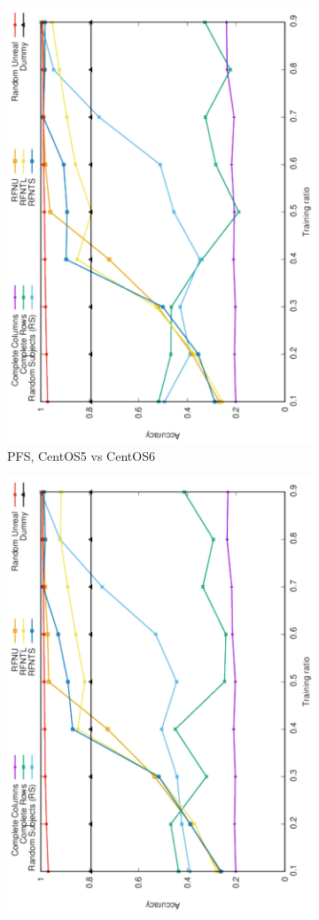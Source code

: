 \documentclass[10pt, conference, compsocconf]{IEEEtran}
\begin{document}
\begin{figure}
\begin{subfigure}[b]{0.4\linewidth}
        \includegraphics[width=0.8\columnwidth, angle=-90]{data/results/means_of_results/ALS/PreFreeSurfer/ALS-PFS-5v6.pdf}
        \caption{PFS, CentOS5 vs CentOS6}
\end{subfigure}
\begin{subfigure}[b]{0.4\linewidth}
        \includegraphics[width=0.8\columnwidth, angle=-90]{data/results/means_of_results/ALS/PreFreeSurfer/ALS-PFS-5v7.pdf}

\end{subfigure}
\end{figure}
\end{document}
